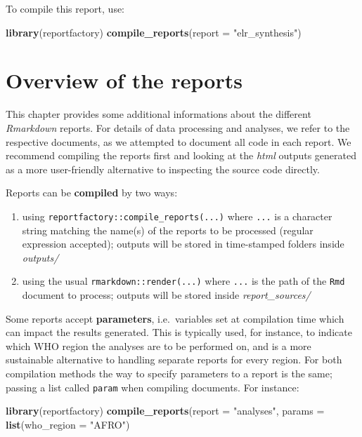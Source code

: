 \documentclass[]{book}
\newenvironment{Shaded}{\begin{snugshade}}{\end{snugshade}}
\newcommand{\DataTypeTok}[1]{\textcolor[rgb]{0.13,0.29,0.53}{#1}}
\newcommand{\KeywordTok}[1]{\textcolor[rgb]{0.13,0.29,0.53}{\textbf{#1}}}
\newcommand{\NormalTok}[1]{#1}
\newcommand{\StringTok}[1]{\textcolor[rgb]{0.31,0.60,0.02}{#1}}
\begin{document}
To compile this report, use:

\begin{Shaded}
\begin{Highlighting}[]

\KeywordTok{library}\NormalTok{(reportfactory)}
\KeywordTok{compile_reports}\NormalTok{(}\DataTypeTok{report =} \StringTok{"elr_synthesis"}\NormalTok{)}
\end{Highlighting}
\end{Shaded}

\hypertarget{reports}{%
\chapter{Overview of the reports}\label{reports}}

This chapter provides some additional informations about the different
\emph{Rmarkdown} reports. For details of data processing and analyses, we refer to
the respective documents, as we attempted to document all code in each
report. We recommend compiling the reports first and looking at the \emph{html}
outputs generated as a more user-friendly alternative to inspecting the source
code directly.

Reports can be \textbf{compiled} by two ways:

\begin{enumerate}
\def\labelenumi{\arabic{enumi}.}
\item
  using \texttt{reportfactory::compile\_reports(...)} where \texttt{...} is a character string
  matching the name(s) of the reports to be processed (regular expression
  accepted); outputs will be stored in time-stamped folders inside \emph{outputs/}
\item
  using the usual \texttt{rmarkdown::render(...)} where \texttt{...} is the path of the \texttt{Rmd}
  document to process; outputs will be stored inside \emph{report\_sources/}
\end{enumerate}

Some reports accept \textbf{parameters}, i.e.~variables set at compilation time which can
impact the results generated. This is typically used, for instance, to indicate
which WHO region the analyses are to be performed on, and is a more sustainable
alternative to handling separate reports for every region. For both compilation
methods the way to specify parameters to a report is the same; passing a list
called \texttt{param} when compiling documents. For instance:

\begin{Shaded}
\begin{Highlighting}[]
\KeywordTok{library}\NormalTok{(reportfactory)}
\KeywordTok{compile_reports}\NormalTok{(}\DataTypeTok{report =} \StringTok{"analyses"}\NormalTok{,}
                \DataTypeTok{params =} \KeywordTok{list}\NormalTok{(}\DataTypeTok{who_region =} \StringTok{"AFRO"}\NormalTok{)}
\end{Highlighting}
\end{Shaded}
\end{document}
